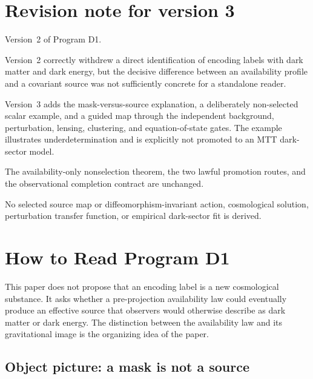\documentclass[11pt]{article}
\begin{document}
\section*{Revision note for version 3}
\begin{description}[leftmargin=2.5cm,style=nextline]
\item[Supersedes.]
Version~2 of Program D1.

\item[Reason.]
Version~2 correctly withdrew a direct identification of encoding labels with
dark matter and dark energy, but the decisive difference between an
availability profile and a covariant source was not sufficiently concrete
for a standalone reader.

\item[Resolution.]
Version~3 adds the mask-versus-source explanation, a deliberately
non-selected scalar example, and a guided map through the independent
background, perturbation, lensing, clustering, and equation-of-state gates.
The example illustrates underdetermination and is explicitly not promoted to
an MTT dark-sector model.

\item[Retained content.]
The availability-only nonselection theorem, the two lawful promotion routes,
and the observational completion contract are unchanged.

\item[Open boundary.]
No selected source map or diffeomorphism-invariant action, cosmological
solution, perturbation transfer function, or empirical dark-sector fit is
derived.
\end{description}

\tableofcontents
\newpage

\section{How to Read Program D1}

This paper does not propose that an encoding label is a new cosmological
substance.  It asks whether a pre-projection availability law could eventually
produce an effective source that observers would otherwise describe as dark
matter or dark energy.  The distinction between the availability law and its
gravitational image is the organizing idea of the paper.

\subsection{Object picture: a mask is not a source}
\end{document}
